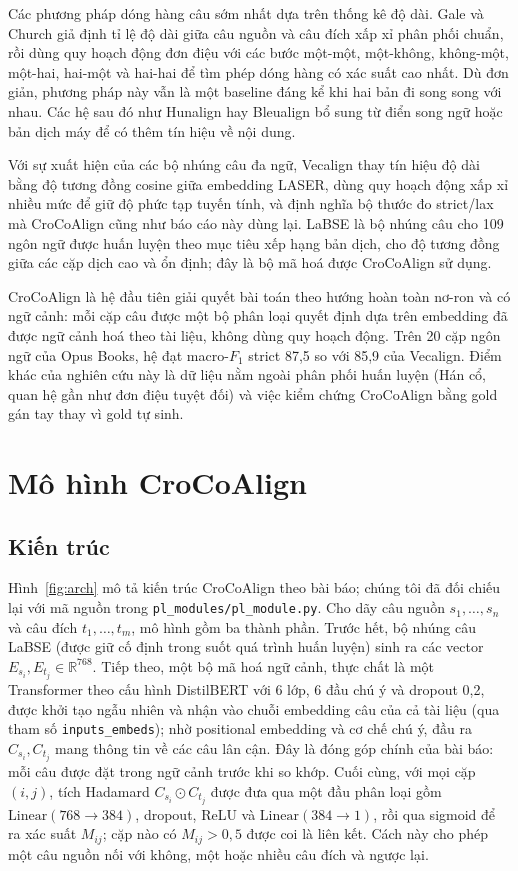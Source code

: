 \documentclass[11pt,a4paper]{article}
\newcommand{\code}[1]{\texttt{#1}}
\newcommand{\croco}{CroCoAlign}
\begin{document}
Các phương pháp dóng hàng câu sớm nhất dựa trên thống kê độ dài. Gale và Church \cite{galechurch} giả định tỉ lệ độ
dài giữa câu nguồn và câu đích xấp xỉ phân phối chuẩn, rồi dùng quy hoạch động đơn điệu với các bước một-một, một-không,
không-một, một-hai, hai-một và hai-hai để tìm phép dóng hàng có xác suất cao nhất. Dù đơn giản, phương pháp này vẫn là
một baseline đáng kể khi hai bản đi song song với nhau. Các hệ sau đó như Hunalign hay Bleualign \cite{bleualign} bổ
sung từ điển song ngữ hoặc bản dịch máy để có thêm tín hiệu về nội dung.

Với sự xuất hiện của các bộ nhúng câu đa ngữ, Vecalign \cite{vecalign} thay tín hiệu độ dài bằng độ tương đồng cosine
giữa embedding LASER, dùng quy hoạch động xấp xỉ nhiều mức để giữ độ phức tạp tuyến tính, và định nghĩa bộ thước đo
strict/lax mà \croco{} cũng như báo cáo này dùng lại. LaBSE \cite{labse} là bộ nhúng câu cho 109 ngôn ngữ được huấn
luyện theo mục tiêu xếp hạng bản dịch, cho độ tương đồng giữa các cặp dịch cao và ổn định; đây là bộ mã hoá được
\croco{} sử dụng.

\croco{} \cite{crocoalign} là hệ đầu tiên giải quyết bài toán theo hướng hoàn toàn nơ-ron và có ngữ cảnh: mỗi cặp câu
được một bộ phân loại quyết định dựa trên embedding đã được ngữ cảnh hoá theo tài liệu, không dùng quy hoạch động. Trên
20 cặp ngôn ngữ của Opus Books, hệ đạt macro-$F_1$ strict 87,5 so với 85,9 của Vecalign. Điểm khác của nghiên cứu này
là dữ liệu nằm ngoài phân phối huấn luyện (Hán cổ, quan hệ gần như đơn điệu tuyệt đối) và việc kiểm chứng \croco{}
bằng gold gán tay thay vì gold tự sinh.

\section{Mô hình \croco{}}\label{sec:model}

\subsection{Kiến trúc}
Hình~\ref{fig:arch} mô tả kiến trúc \croco{} theo bài báo; chúng tôi đã đối chiếu lại với mã nguồn trong
\code{pl\_modules/pl\_module.py}. Cho dãy câu nguồn $s_1,\dots,s_n$ và câu đích $t_1,\dots,t_m$, mô hình gồm ba
thành phần. Trước hết, bộ nhúng câu LaBSE (được giữ cố định trong suốt quá trình huấn luyện) sinh ra các vector
$E_{s_i}, E_{t_j}\in\mathbb{R}^{768}$. Tiếp theo, một bộ mã hoá ngữ cảnh, thực chất là một Transformer theo cấu hình
DistilBERT với 6 lớp, 6 đầu chú ý và dropout 0,2, được khởi tạo ngẫu nhiên và nhận vào chuỗi embedding câu của cả tài
liệu (qua tham số \code{inputs\_embeds}); nhờ positional embedding và cơ chế chú ý, đầu ra $C_{s_i}, C_{t_j}$ mang thông
tin về các câu lân cận. Đây là đóng góp chính của bài báo: mỗi câu được đặt trong ngữ cảnh trước khi so khớp. Cuối
cùng, với mọi cặp $(i,j)$, tích Hadamard $C_{s_i}\odot C_{t_j}$ được đưa qua một đầu phân loại gồm
$\text{Linear}(768{\to}384)$, dropout, ReLU và $\text{Linear}(384{\to}1)$, rồi qua sigmoid để ra xác suất $M_{ij}$;
cặp nào có $M_{ij}>0{,}5$ được coi là liên kết. Cách này cho phép một câu nguồn nối với không, một hoặc nhiều câu đích
và ngược lại.
\end{document}
